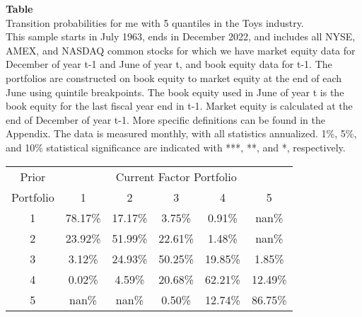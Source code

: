 \begin{table*}[ht!]
\raggedright
{}
\label{tab: transition_probs_me_Toys_with_5_quantiles}
\textbf{Table \thetable} \\
Transition probabilities for me with 5 quantiles in the Toys industry. \\
\hspace*{1em}This sample starts in July 1963, ends in December 2022, and includes all NYSE, AMEX, and NASDAQ common stocks for which we have market equity data for December of year t-1 and June of year t, and book equity data for t-1. The portfolios are constructed on book equity to market equity at the end of each June using quintile breakpoints.  The book equity used in June of year t is the book equity for the last fiscal year end in t-1.  Market equity is calculated at the end of December of year t-1.  More specific definitions can be found in the Appendix.  The data is measured monthly, with all statistics annualized.  1\%, 5\%, and 10\% statistical significance are indicated with ***, **, and *, respectively. \\
\vspace{0.5em}
\centering
\begin{adjustbox}{max width=\textwidth}
\begin{tabular}{@{}cccccc@{}}
\toprule
Prior & \multicolumn{5}{c}{Current Factor Portfolio} \\
Portfolio & 1 & 2 & 3 & 4 & 5 \\
\midrule
1 & 78.17\% & 17.17\% & 3.75\% & 0.91\% & nan\% \\
2 & 23.92\% & 51.99\% & 22.61\% & 1.48\% & nan\% \\
3 & 3.12\% & 24.93\% & 50.25\% & 19.85\% & 1.85\% \\
4 & 0.02\% & 4.59\% & 20.68\% & 62.21\% & 12.49\% \\
5 & nan\% & nan\% & 0.50\% & 12.74\% & 86.75\% \\
\bottomrule
\end{tabular}
\end{adjustbox}
\end{table*}